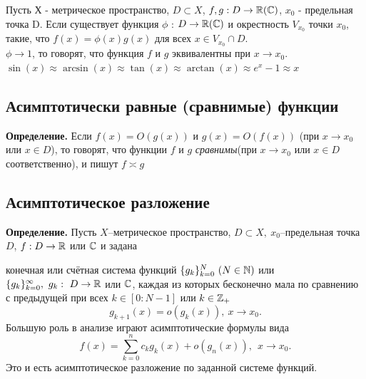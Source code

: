 Пусть Х - метрическое пространство, $D \subset X$, $f,g: D \to \operatorname*{\mathbb{R}}(\mathbb{C})$, $x_0$ - предельная точка D. Если существует функция $\phi$ : $D \to \operatorname*{\mathbb{R}}(\mathbb{C})$ и окрестность $V_{x_0}$ точки $x_0$, такие, что $f(x) = \phi(x)g(x)$ для всех 
$x \in V_{x_0} \cap D$.\\

$\phi \to 1$, то  говорят, что функция $f$ и $g$ эквивалентны при $x \to x_0$.\\
$\sin(x) \approx \arcsin(x) \approx \tan(x) \approx \arctan(x) \approx e^x - 1 \approx x$

\newpage
{}
\subsection{Асимптотически равные (сравнимые) функции}

\textbf{Определение.} Если $f(x) = O(g(x))$ и $g(x) = O(f(x))$ (при $x \to x_0$ или $x \in D$), то говорят, что функции $f$ и $g$ \textit{сравнимы}(при $x \to x_0$ 
или $x \in D$ соответственно), и пишут $f \asymp g$

\subsection{Асимптотическое разложение}
\textbf{Определение.} 
Пусть $X$--метрическое пространство, $D \subset X,\ x_0$--предельная точка $D$, $f: D \to \operatorname*{\mathbb{R}}$ или $\mathbb{C}$ и задана

конечная или счётная система функций $ \{g_k\}_{k=0}^N\ (N \in \operatorname*{\mathbb{N}})$ или $\{g_k\}_{k=0}^{\infty},\ g_k:\ D \to \operatorname*{\mathbb{R}}$ или $ \mathbb{C}$, каждая из которых бесконечно мала по сравнению с предыдущей при всех $k \in 
[0: N-1] $ или $k \in \operatorname*{\mathbb{Z}}_{+}$ 
$$g_{k+1}(x) = o(g_k(x)),\ x\to x_0.$$
Большую роль в анализе играют асимптотические формулы вида $$f(x) = \sum_{k=0}^n c_kg_k(x) + o(g_n(x)),\ \ x \to x_0.$$
Это и есть асимптотическое разложение по заданной системе функций.


